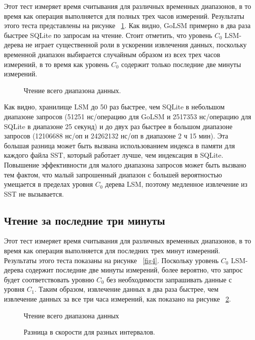 Этот тест измеряет время считывания для различных временных диапазонов, в то время как операция выполняется для полных трех часов измерений. Результаты этого теста представлены на рисунке ~\ref{fig3}. Как видно, GoLSM примерно в два раза быстрее SQLite по запросам на чтение. Стоит отметить, что уровень $C_0$ LSM-дерева не играет существенной роли в ускорении извлечения данных, поскольку временной диапазон выбирается случайным образом из всех трех часов измерений, в то время как уровень $C_0$ содержит только последние две минуты измерений.

\begin{figure}[h!]
	\centering
	
	\caption{Чтение всего диапазона данных.} \label{fig3}
\end{figure}

Как видно, хранилище LSM до 50 раз быстрее, чем SQLite в небольшом диапазоне запросов (51251 нс/операцию для GoLSM и 2517353 нс/операцию для SQLite в диапазоне 25 секунд) и до двух раз быстрее в большом диапазоне запросов (12106688 нс/оп и 24262132 нс/оп в диапазоне 2 ч 15 мин). Эта большая разница может быть вызвана использованием индекса в памяти для каждого файла SST, который работает лучше, чем индексация в SQLite. Повышение эффективности для малого диапазона запросов может быть вызвано тем фактом, что малый запрошенный диапазон с большей вероятностью умещается в пределах уровня $C_0$ дерева LSM, поэтому медленное извлечение из SST не вызывается.

\subsection{Чтение за последние три минуты}

Этот тест измеряет время считывания для различных временных диапазонов, в то время как операция выполняется для последних трех минут измерений. Результаты этого теста показаны на рисунке ~\ref{fig4}. Поскольку уровень $C_0$ LSM-дерева содержит последние две минуты измерений, более вероятно, что запрос будет соответствовать уровню $C_0$ без необходимости запрашивать данные с уровня $C_1$. Таким образом, извлечение данных в два раза быстрее, чем извлечение данных за все три часа измерений, как показано на рисунке ~\ref{fig5}. 

\begin{figure}[!htb]
	\begin{minipage}{0.48\textwidth}
		\centering
		\resizebox{\textwidth}{!}{%
			
		}
		\caption{Чтение всего диапазона данных}\label{fig4}
	\end{minipage}\hfill
	\begin{minipage}{0.48\textwidth}
		\centering
		\resizebox{\textwidth}{!}{%
			
		}
		\caption{Разница в скорости для разных интервалов.}\label{fig5}
	\end{minipage}
\end{figure}

